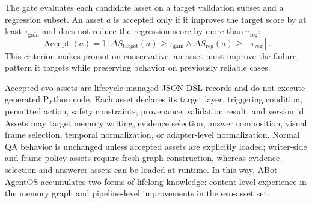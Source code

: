 


The gate evaluates each candidate asset on a target validation subset and a regression subset.
An asset $a$ is accepted only if it improves the target score by at least $\tau_{\mathrm{gain}}$ and does not reduce the regression score by more than $\tau_{\mathrm{reg}}$:
\begin{equation}
    \operatorname{Accept}(a)=
    \mathbb{I}\left[
    \Delta S_{\mathrm{target}}(a) \geq \tau_{\mathrm{gain}}
    \land
    \Delta S_{\mathrm{reg}}(a) \geq -\tau_{\mathrm{reg}}
    \right].
    \label{eq:gate_criterion}
\end{equation}
This criterion makes promotion conservative: an asset must improve the failure pattern it targets while preserving behavior on previously reliable cases.

Accepted evo-assets are lifecycle-managed JSON DSL records and do not execute generated Python code.
Each asset declares its target layer, triggering condition, permitted action, safety constraints, provenance, validation result, and version id.
Assets may target memory writing, evidence selection, answer composition, visual frame selection, temporal normalization, or adapter-level normalization.
Normal QA behavior is unchanged unless accepted assets are explicitly loaded; writer-side and frame-policy assets require fresh graph construction, whereas evidence-selection and answerer assets can be loaded at runtime.
In this way, ABot-AgentOS accumulates two forms of lifelong knowledge: content-level experience in the memory graph and pipeline-level improvements in the evo-asset set.


